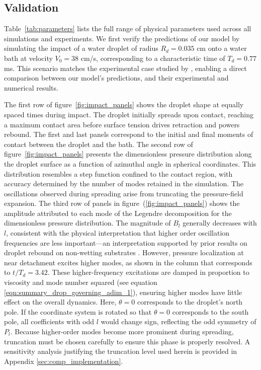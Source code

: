 \documentclass{jfm}
\begin{document}
\subsection{Validation}

Table~\ref{tab:parameters} lists the full range of physical parameters used across all simulations and experiments. We first verify the predictions of our model by simulating the impact of a water droplet of radius $R_d = 0.035$ cm onto a water bath at velocity $V_0 = 38$ cm/s, corresponding to a characteristic time of $T_d = 0.77$ ms. This scenario matches the experimental case studied by \citep{AlventosaEtAl2023}, enabling a direct comparison between our model’s predictions, and their experimental and numerical results. 

The first row of figure~\ref{fig:impact_panels} shows the droplet shape at equally spaced times during impact. The droplet initially spreads upon contact, reaching a maximum contact area before surface tension drives retraction and powers rebound. The first and last panels correspond to the initial and final moments of contact between the droplet and the bath. The second row of figure~\ref{fig:impact_panels} presents the dimensionless pressure distribution along the droplet surface as a function of azimuthal angle in spherical coordinates. This distribution resembles a step function confined to the contact region, with accuracy determined by the number of modes retained in the simulation. The oscillations observed during spreading arise from truncating the pressure-field expansion. The third row of panels in figure~(\ref{fig:impact_panels}) shows the amplitude attributed to each mode of the Legendre decomposition for the dimensionless pressure distribution. The magnitude of $B_l$ generally decreases with $l$, consistent with the physical interpretation that higher order oscillation frequencies are less important---an interpretation supported by prior results on droplet rebound on non-wetting substrates \citep{GabbardEtAl2025}. However, pressure localization at near detachment excites higher modes, as shown in the column that corresponds to $t/T_d = 3.42$. These higher-frequency excitations are damped in proportion to viscosity and mode number squared (see equation \ref{eqn:summary_drop_governing_adim_1}), ensuring higher modes have little effect on the overall dynamics. Here, $\theta = 0$ corresponds to the droplet’s north pole. If the coordinate system is rotated so that $\theta = 0$ corresponds to the south pole, all coefficients with odd $l$ would change sign, reflecting the odd symmetry of $P_l$. Because higher-order modes become more prominent during spreading, truncation must be chosen carefully to ensure this phase is properly resolved. A sensitivity analysis justifying the truncation level used herein is provided in Appendix \ref{sec:comp_implementation}.
\end{document}
